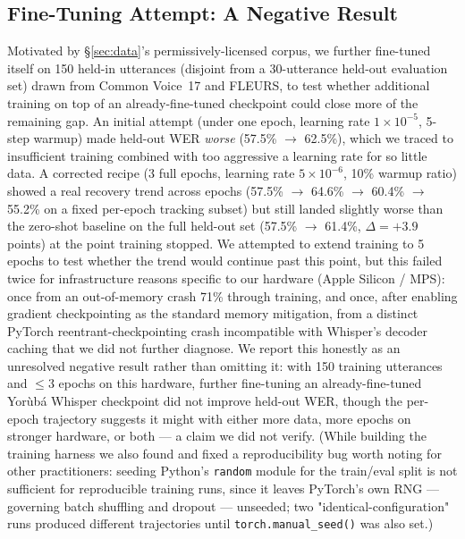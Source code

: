 \subsection{Fine-Tuning Attempt: A Negative Result}
\label{sec:finetune-results}
Motivated by \S\ref{sec:data}'s permissively-licensed corpus, we further
fine-tuned \citet{whisper-small-yoruba} itself on 150 held-in utterances
(disjoint from a 30-utterance held-out evaluation set) drawn from Common
Voice~17 and FLEURS, to test whether additional training on top of an
already-fine-tuned checkpoint could close more of the remaining gap. An
initial attempt (under one epoch, learning rate $1\times10^{-5}$, 5-step
warmup) made held-out WER \emph{worse} (57.5\% $\to$ 62.5\%), which we
traced to insufficient training combined with too aggressive a learning
rate for so little data. A corrected recipe (3 full epochs, learning rate
$5\times10^{-6}$, 10\% warmup ratio) showed a real recovery trend across
epochs (57.5\% $\to$ 64.6\% $\to$ 60.4\% $\to$ 55.2\% on a fixed
per-epoch tracking subset) but still landed slightly worse than the
zero-shot baseline on the full held-out set (57.5\% $\to$ 61.4\%,
$\Delta{=}{+}3.9$ points) at the point training stopped. We attempted to
extend training to 5 epochs to test whether the trend would continue past
this point, but this failed twice for infrastructure reasons specific to
our hardware (Apple Silicon / MPS): once from an out-of-memory crash 71\%
through training, and once, after enabling gradient checkpointing as the
standard memory mitigation, from a distinct PyTorch reentrant-checkpointing
crash incompatible with Whisper's decoder caching that we did not
further diagnose. We report this honestly as an unresolved negative
result rather than omitting it: with 150 training utterances and $\leq$3
epochs on this hardware, further fine-tuning an already-fine-tuned
Yor\`ub\'a Whisper checkpoint did not improve held-out WER, though the
per-epoch trajectory suggests it might with either more data, more epochs
on stronger hardware, or both --- a claim we did not verify. (While
building the training harness we also found and fixed a reproducibility
bug worth noting for other practitioners: seeding Python's \texttt{random}
module for the train/eval split is not sufficient for reproducible
training runs, since it leaves PyTorch's own RNG --- governing batch
shuffling and dropout --- unseeded; two "identical-configuration" runs
produced different trajectories until \texttt{torch.manual\_seed()} was
also set.)

